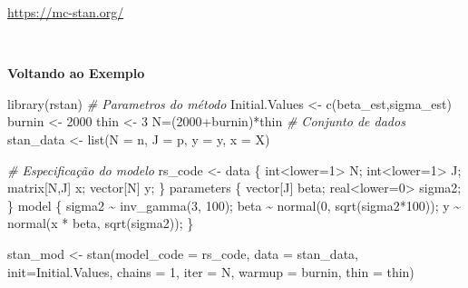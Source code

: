 \documentclass[
]{book}
\newenvironment{Shaded}{\begin{snugshade}}{\end{snugshade}}
\newcommand{\AttributeTok}[1]{\textcolor[rgb]{0.77,0.63,0.00}{#1}}
\newcommand{\CommentTok}[1]{\textcolor[rgb]{0.56,0.35,0.01}{\textit{#1}}}
\newcommand{\DecValTok}[1]{\textcolor[rgb]{0.00,0.00,0.81}{#1}}
\newcommand{\FunctionTok}[1]{\textcolor[rgb]{0.00,0.00,0.00}{#1}}
\newcommand{\NormalTok}[1]{#1}
\newcommand{\OtherTok}[1]{\textcolor[rgb]{0.56,0.35,0.01}{#1}}
\newcommand{\SpecialCharTok}[1]{\textcolor[rgb]{0.00,0.00,0.00}{#1}}
\newcommand{\StringTok}[1]{\textcolor[rgb]{0.31,0.60,0.02}{#1}}
\begin{document}
\url{https://mc-stan.org/}

\(~\)

\textbf{Voltando ao Exemplo}

\begin{Shaded}
\begin{Highlighting}[]
\FunctionTok{library}\NormalTok{(rstan)}
\CommentTok{\# Parametros do método}
\NormalTok{Initial.Values }\OtherTok{\textless{}{-}} \FunctionTok{c}\NormalTok{(beta\_est,sigma\_est)}
\NormalTok{burnin }\OtherTok{\textless{}{-}} \DecValTok{2000}
\NormalTok{thin }\OtherTok{\textless{}{-}} \DecValTok{3}
\NormalTok{N}\OtherTok{=}\NormalTok{(}\DecValTok{2000}\SpecialCharTok{+}\NormalTok{burnin)}\SpecialCharTok{*}\NormalTok{thin}
\CommentTok{\# Conjunto de dados}
\NormalTok{stan\_data }\OtherTok{\textless{}{-}} \FunctionTok{list}\NormalTok{(}\AttributeTok{N =}\NormalTok{ n, }\AttributeTok{J =}\NormalTok{ p, }\AttributeTok{y =}\NormalTok{ y, }\AttributeTok{x =}\NormalTok{ X)}

\CommentTok{\# Especificação do modelo}
\NormalTok{rs\_code }\OtherTok{\textless{}{-}} \StringTok{\textquotesingle{}}
\StringTok{  data \{}
\StringTok{    int\textless{}lower=1\textgreater{} N;}
\StringTok{    int\textless{}lower=1\textgreater{} J;}
\StringTok{    matrix[N,J] x;}
\StringTok{    vector[N] y;}
\StringTok{  \}}
\StringTok{  parameters \{}
\StringTok{    vector[J] beta;}
\StringTok{    real\textless{}lower=0\textgreater{} sigma2;}
\StringTok{  \}}
\StringTok{  model \{}
\StringTok{    sigma2 \textasciitilde{} inv\_gamma(3, 100);}
\StringTok{    beta \textasciitilde{} normal(0, sqrt(sigma2*100));}
\StringTok{    y \textasciitilde{} normal(x * beta, sqrt(sigma2));}
\StringTok{\}\textquotesingle{}}

\NormalTok{stan\_mod }\OtherTok{\textless{}{-}} \FunctionTok{stan}\NormalTok{(}\AttributeTok{model\_code =}\NormalTok{ rs\_code, }\AttributeTok{data =}\NormalTok{ stan\_data, }\AttributeTok{init=}\NormalTok{Initial.Values,}
            \AttributeTok{chains =} \DecValTok{1}\NormalTok{, }\AttributeTok{iter =}\NormalTok{ N, }\AttributeTok{warmup =}\NormalTok{ burnin, }\AttributeTok{thin =}\NormalTok{ thin)}
\end{Highlighting}
\end{Shaded}
\end{document}
